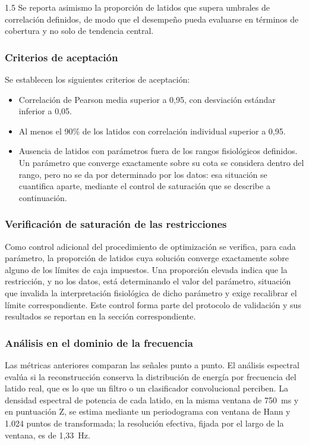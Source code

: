 \begin{spacing}{1.5}
Se reporta asimismo la proporción de latidos que supera umbrales de correlación definidos, de modo que el desempeño pueda evaluarse en términos de cobertura y no solo de tendencia central.

\subsubsection{Criterios de aceptación}

Se establecen los siguientes criterios de aceptación:

\begin{itemize}
    \item Correlación de Pearson media superior a 0,95, con desviación estándar inferior a 0,05.
    \item Al menos el 90\% de los latidos con correlación individual superior a 0,95.
    \item Ausencia de latidos con parámetros fuera de los rangos fisiológicos definidos. Un parámetro que converge exactamente sobre su cota se considera dentro del rango, pero no se da por determinado por los datos: esa situación se cuantifica aparte, mediante el control de saturación que se describe a continuación.
\end{itemize}

\subsubsection{Verificación de saturación de las restricciones}

Como control adicional del procedimiento de optimización se verifica, para cada parámetro, la proporción de latidos cuya solución converge exactamente sobre alguno de los límites de caja impuestos. Una proporción elevada indica que la restricción, y no los datos, está determinando el valor del parámetro, situación que invalida la interpretación fisiológica de dicho parámetro y exige recalibrar el límite correspondiente. Este control forma parte del protocolo de validación y sus resultados se reportan en la sección correspondiente.

\subsubsection{Análisis en el dominio de la frecuencia}\label{sec:met_espectral}

Las métricas anteriores comparan las señales punto a punto. El análisis espectral evalúa si la reconstrucción conserva la distribución de energía por frecuencia del latido real, que es lo que un filtro o un clasificador convolucional perciben. La densidad espectral de potencia de cada latido, en la misma ventana de 750~ms y en puntuación Z, se estima mediante un periodograma con ventana de Hann y 1.024 puntos de transformada; la resolución efectiva, fijada por el largo de la ventana, es de 1,33~Hz.


\end{spacing}
